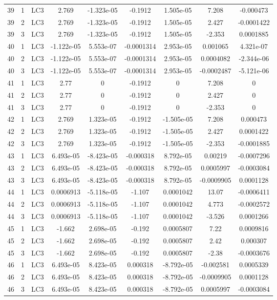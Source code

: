 \documentclass{article}%
\begin{document}
\begin{longtable}{| c c c | c c c c c c |}
39&1&LC3&2.769&{-}1.323e{-}05&{-}0.1912&1.505e{-}05&7.208&{-}0.000473\\%
39&2&LC3&2.769&{-}1.323e{-}05&{-}0.1912&1.505e{-}05&2.427&{-}0.0001422\\%
39&3&LC3&2.769&{-}1.323e{-}05&{-}0.1912&1.505e{-}05&{-}2.353&0.0001885\\%
40&1&LC3&{-}1.122e{-}05&5.553e{-}07&{-}0.0001314&2.953e{-}05&0.001065&4.321e{-}07\\%
40&2&LC3&{-}1.122e{-}05&5.553e{-}07&{-}0.0001314&2.953e{-}05&0.0004082&{-}2.344e{-}06\\%
40&3&LC3&{-}1.122e{-}05&5.553e{-}07&{-}0.0001314&2.953e{-}05&{-}0.0002487&{-}5.121e{-}06\\%
41&1&LC3&2.77&0&{-}0.1912&0&7.208&0\\%
41&2&LC3&2.77&0&{-}0.1912&0&2.427&0\\%
41&3&LC3&2.77&0&{-}0.1912&0&{-}2.353&0\\%
42&1&LC3&2.769&1.323e{-}05&{-}0.1912&{-}1.505e{-}05&7.208&0.000473\\%
42&2&LC3&2.769&1.323e{-}05&{-}0.1912&{-}1.505e{-}05&2.427&0.0001422\\%
42&3&LC3&2.769&1.323e{-}05&{-}0.1912&{-}1.505e{-}05&{-}2.353&{-}0.0001885\\%
43&1&LC3&6.493e{-}05&{-}8.423e{-}05&{-}0.000318&8.792e{-}05&0.00219&{-}0.0007296\\%
43&2&LC3&6.493e{-}05&{-}8.423e{-}05&{-}0.000318&8.792e{-}05&0.0005997&{-}0.0003084\\%
43&3&LC3&6.493e{-}05&{-}8.423e{-}05&{-}0.000318&8.792e{-}05&{-}0.0009905&0.0001128\\%
44&1&LC3&0.0006913&{-}5.118e{-}05&{-}1.107&0.0001042&13.07&{-}0.0006411\\%
44&2&LC3&0.0006913&{-}5.118e{-}05&{-}1.107&0.0001042&4.773&{-}0.0002572\\%
44&3&LC3&0.0006913&{-}5.118e{-}05&{-}1.107&0.0001042&{-}3.526&0.0001266\\%
45&1&LC3&{-}1.662&2.698e{-}05&{-}0.192&0.0005807&7.22&0.0009816\\%
45&2&LC3&{-}1.662&2.698e{-}05&{-}0.192&0.0005807&2.42&0.000307\\%
45&3&LC3&{-}1.662&2.698e{-}05&{-}0.192&0.0005807&{-}2.38&{-}0.0003676\\%
46&1&LC3&6.493e{-}05&8.423e{-}05&0.000318&{-}8.792e{-}05&{-}0.002581&0.0005339\\%
46&2&LC3&6.493e{-}05&8.423e{-}05&0.000318&{-}8.792e{-}05&{-}0.0009905&0.0001128\\%
46&3&LC3&6.493e{-}05&8.423e{-}05&0.000318&{-}8.792e{-}05&0.0005997&{-}0.0003084\\%

\end{longtable}
\end{document}
